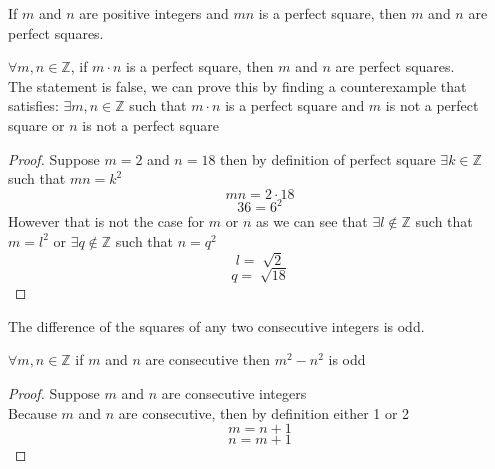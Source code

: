 \documentclass[12pt,letterpaper, onecolumn]{exam}
\begin{document}
\begin{questions}
		\setcounter{question}{56} \question If $m$ and $n$ are positive integers and $mn$ is a perfect square, then $m$ and $n$ are perfect squares.   
		
		\begin{solution}
			$\forall m,n \in \mathbb{Z}$, if $m\cdot n$ is a perfect square, then $m$ and $n$ are perfect squares.\\
			The statement is false, we can prove this by finding a counterexample that satisfies:
			$\exists m,n \in \mathbb{Z}$ such that $m\cdot n$  is a perfect square and $m$ is not a perfect square or $n$ is not a perfect square
			\begin{proof}
			Suppose $m=2$ and $n=18$ then by definition of perfect square $\exists k \in \mathbb{Z}$ such that $mn = k^2$
			$$mn = 2\cdot18$$
			$$36 = 6^2$$
			However that is not the case for $m$ or $n$ as we can see that $\exists l \notin \mathbb{Z}$ such that $m=l^2$ or $\exists q \notin \mathbb{Z}$ such that $n=q^2$
			$$l = \sqrt[]{2}$$
			$$q = \sqrt[]{18}$$
			\end{proof}
		\end{solution}
		
		\setcounter{question}{57} \question The difference of the squares of any two consecutive integers is odd. 
		
		\begin{solution}
			$\forall m,n \in \mathbb{Z}$ if $m$ and $n$ are consecutive then $m^2-n^2$ is odd
			\begin{proof}
				Suppose $m$ and $n$ are consecutive integers\\
				Because $m$ and $n$ are consecutive, then by definition either 1 or 2\\
				$$m=n+1$$ 
				$$n=m+1$$
			\end{proof}
		\end{solution}
	\end{questions}
	
\end{document}
